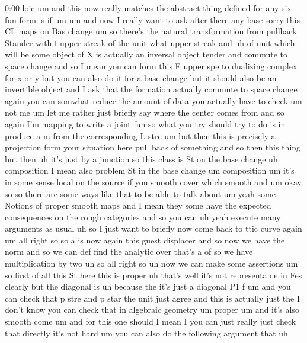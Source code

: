 \begin{unfinished}{0:00}
loic  um  and  this  now  really  matches  the
abstract  thing  defined  for  any  six  fun
form
is  if
um
um  and  now  I  really  want  to  ask  after
there  any
base
sorry  this  CL  maps  on  Bas
change  um  so  there's  the  natural
transformation  from  pullback  Stander
with  f  upper  streak  of  the  unit  what
upper
streak
and  uh  of  unit  which  will  be
some  object  of  X  is  actually  an  inversal
object
tender  and  commute  to  space
change
and  so  I  mean  you  can  form  this  F  upper
spe  to  dualizing  complex  for  x  or  y  but
you  can  also  do  it  for  a  base  change  but
it  should  also  be  an  invertible  object
and  I  ask  that  the  formation  actually
commute  to  space
change  again  you  can  somwhat  reduce  the
amount  of  data  you  actually  have  to
check
um  not
me
um  let  me  rather  just  briefly  say  where
the  center  comes
from  and  so  again  I'm  mapping  to  write  a
joint  fun  so  what  you  try  should  try  to
do  is  in  produce  a  m  from  the
corresponding  L
stre
um  but  then  this  is  precisely  a
projection  form  your
situation  here  pull  back  of  something
and  so  then  this
thing  but  then  uh  it's  just  by  a
junction
so  this  class  is  St  on  the  base  change
uh  composition  I  mean  also  problem  St  in
the  base  change  um  composition
um  it's  in  some  sense  local  on  the
source  if  you  smooth  cover  which  smooth
and  um  okay
so  so  there  are  some  ways  like  that  to
be  able  to  talk  about
um
yeah  some  Notions  of  proper  smooth  maps
and  I  mean  they  some  have  the  expected
consequences  on  the  rough  categories  and
so  you
can  uh  yeah  execute  many  arguments  as
usual  uh  so  I  just  want  to  briefly  now
come  back  to  ttic  curve
again
um
all  right  so  so  a  is  now  again  this
guest
displacer  and  so  now  we  have  the  norm
and  so  we  can  def  find  the  analytic
over  that's  a
of  so  we  have  multiplication  by  two  uh
so  all  right
so
uh  now  we  can  make  some  assertions
um  so  first  of  all  this  St  here  this  is
proper  uh
that's  well  it's  not  representable  in
Fes  clearly  but  the  diagonal
is
uh  because  the  it's  just  a  diagonal  P1  f
um  and  you  can  check  that  p  stre  and  p
star  the  unit  just  agree  and  this  is
actually  just  the  I  don't
know  you  can  check  that  in  algebraic
geometry
um  proper  um  and  it's  also
smooth
come
um  and  for  this  one  should  I  mean
I  you  can  just  really  just  check  that
directly  it's  not  hard  um  you  can  also
do  the  following  argument  that  uh

\end{unfinished}
